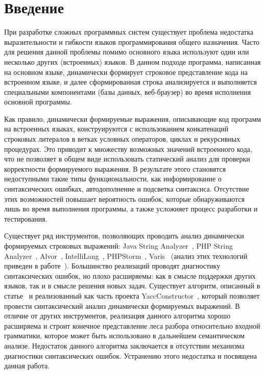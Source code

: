 \section*{Введение}

При разработке сложных программных систем существует проблема недостатка выразительности и гибкости языков программирования общего назначения. Часто для решения данной проблемы помимо основного языка используют один или несколько других (встроенных) языков. В данном подходе программа, написанная на основном языке, динамически формирует строковое представление кода на встроенном языке, и далее сформированная строка анализируется и выполняется специальными компонентами (базы данных, веб-браузер) во время исполнения основной программы.

Как правило, динамически формируемые выражения, описывающие код программ на встроенных языках, конструируются с использованием конкатенаций строковых литералов в ветках условных операторов, циклах и рекурсивных процедурах. Это приводит к множеству возможных значений встроенного кода, что не позволяет в общем виде использовать статический анализ для проверки корректности формируемого выражения. В результате этого становятся недоступными такие типы функциональности, как информирование о синтаксических ошибках, автодополнение и подсветка синтаксиса. Отсутствие этих возможностей повышает вероятность ошибок, которые обнаруживаются лишь во время выполнения программы, а также усложняет процесс разработки и тестирования.

Существует ряд инструментов, позволяющих проводить анализ динамически формируемых строковых выражений: Java String Analyzer~\cite{JSA,JSAUrl}, PHP String Analyzer~\cite{PHPSA}, Alvor~\cite{Alvor1, Alvor2, AlvorUrl}, IntelliLang~\cite{IntelliLang}, PHPStorm~\cite{PHPStorm}, Varis~\cite{Varis} (анализ этих технологий приведен в работе~\cite{SemonPHD}). Большинство реализаций проводят диагностику синтаксических ошибок, но плохо расширяемы: как в смысле поддержки других языков, так и в смысле решения новых задач. Существует алгоритм, описанный в статье~\cite{ARNGLR} и реализованный как часть проекта YaccConstructor~\cite{YC}, который позволяет провести синтаксический анализ динамически формируемых выражений. В отличие от других инструментов, реализация данного алгоритма хорошо расширяема и строит конечное представление леса разбора относительно входной грамматики, которое может быть использовано в дальнейшем семантическом анализе. Недостаток данного алгоритма заключается в отсутствии механизма диагностики синтаксических ошибок. Устранению этого недостатка и посвящена данная работа.
